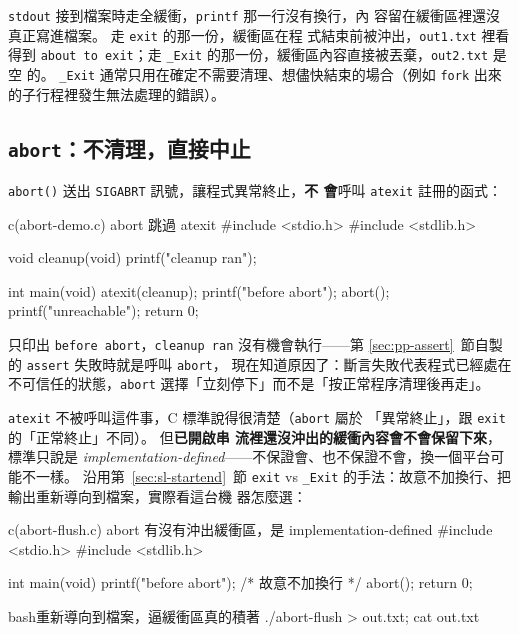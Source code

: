 \texttt{stdout} 接到檔案時走全緩衝，\texttt{printf} 那一行沒有換行，內
容留在緩衝區裡還沒真正寫進檔案。 走 \texttt{exit} 的那一份，緩衝區在程
式結束前被沖出，\texttt{out1.txt} 裡看得到 \texttt{about to exit}；走
\texttt{\_Exit} 的那一份，緩衝區內容直接被丟棄，\texttt{out2.txt} 是空
的。 \texttt{\_Exit} 通常只用在確定不需要清理、想儘快結束的場合（例如
\texttt{fork} 出來的子行程裡發生無法處理的錯誤）。

\subsection{\texttt{abort}：不清理，直接中止}

\texttt{abort()} 送出 \texttt{SIGABRT} 訊號，讓程式異常終止，\textbf{不
會}呼叫 \texttt{atexit} 註冊的函式：

\begin{example}{c}{(abort-demo.c) abort 跳過 atexit}
#include <stdio.h>
#include <stdlib.h>

void cleanup(void) { printf("cleanup ran\n"); }

int main(void) {
    atexit(cleanup);
    printf("before abort\n");
    abort();
    printf("unreachable\n");
    return 0;
}
\end{example}


只印出 \texttt{before abort}，\texttt{cleanup ran} 沒有機會執行——第
\ref{sec:pp-assert}~節自製的 \texttt{assert} 失敗時就是呼叫 \texttt{abort}，
現在知道原因了：斷言失敗代表程式已經處在不可信任的狀態，\texttt{abort}
選擇「立刻停下」而不是「按正常程序清理後再走」。

\texttt{atexit} 不被呼叫這件事，C 標準說得很清楚（\texttt{abort} 屬於
「異常終止」，跟 \texttt{exit} 的「正常終止」不同）。 但\textbf{已開啟串
流裡還沒沖出的緩衝內容會不會保留下來}，標準只說是
\textit{implementation-defined}——不保證會、也不保證不會，換一個平台可
能不一樣。 沿用第~\ref{sec:sl-startend}~節 \texttt{exit} vs
\texttt{\_Exit} 的手法：故意不加換行、把輸出重新導向到檔案，實際看這台機
器怎麼選：

\begin{example}{c}{(abort-flush.c) abort 有沒有沖出緩衝區，是 implementation-defined}
#include <stdio.h>
#include <stdlib.h>

int main(void) {
    printf("before abort"); /* 故意不加換行 */
    abort();
    return 0;
}
\end{example}

\begin{code}{bash}{重新導向到檔案，逼緩衝區真的積著}
./abort-flush > out.txt; cat out.txt
\end{code}


